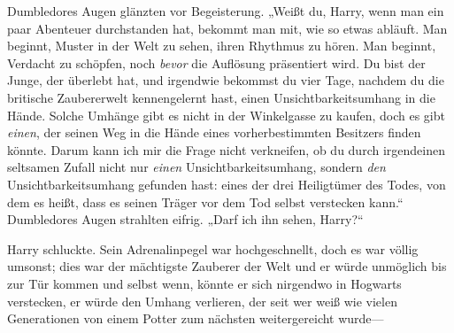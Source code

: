 Dumbledores Augen glänzten vor Begeisterung. „Weißt du, Harry, wenn man ein paar Abenteuer durchstanden hat, bekommt man mit, wie so etwas abläuft. Man beginnt, Muster in der Welt zu sehen, ihren Rhythmus zu hören. Man beginnt, Verdacht zu schöpfen, noch \emph{bevor} die Auflösung präsentiert wird. Du bist der Junge, der überlebt hat, und irgendwie bekommst du vier Tage, nachdem du die britische Zaubererwelt kennengelernt hast, einen Unsichtbarkeitsumhang in die Hände. Solche Umhänge gibt es nicht in der Winkelgasse zu kaufen, doch es gibt \emph{einen}, der seinen Weg in die Hände eines vorherbestimmten Besitzers finden könnte. Darum kann ich mir die Frage nicht verkneifen, ob du durch irgendeinen seltsamen Zufall nicht nur \emph{einen} Unsichtbarkeitsumhang, sondern \emph{den} Unsichtbarkeitsumhang gefunden hast: eines der drei Heiligtümer des Todes, von dem es heißt, dass es seinen Träger vor dem Tod selbst verstecken kann.“ Dumbledores Augen strahlten eifrig. „Darf ich ihn sehen, Harry?“

Harry schluckte. Sein Adrenalinpegel war hochgeschnellt, doch es war völlig umsonst; dies war der mächtigste Zauberer der Welt und er würde unmöglich bis zur Tür kommen und selbst wenn, könnte er sich nirgendwo in Hogwarts verstecken, er würde den Umhang verlieren, der seit wer weiß wie vielen Generationen von einem Potter zum nächsten weitergereicht wurde—

